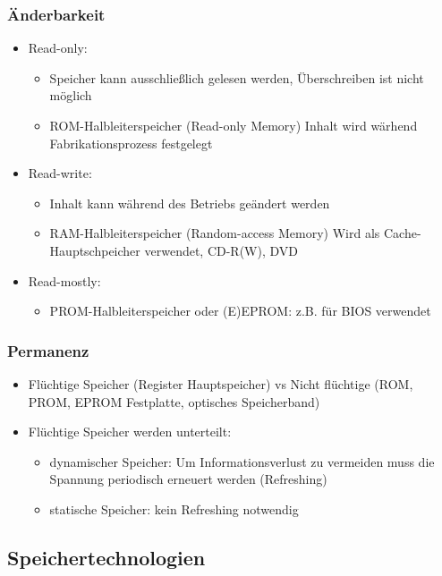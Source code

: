 		\subsubsection{Änderbarkeit}
			\begin{itemize}
				\item Read-only:
					\begin{itemize}
						\item Speicher kann ausschlie\ss lich gelesen werden, Überschreiben ist nicht möglich
						\item ROM-Halbleiterspeicher (Read-only Memory) Inhalt wird wärhend Fabrikationsprozess
							festgelegt
					\end{itemize}
				\item Read-write:
					\begin{itemize}
						\item Inhalt kann während des Betriebs geändert werden
						\item RAM-Halbleiterspeicher (Random-access Memory) Wird als Cache- Hauptschpeicher verwendet, 
							CD-R(W), DVD
					\end{itemize}
				\item Read-mostly:
					\begin{itemize}
						\item PROM-Halbleiterspeicher oder (E)EPROM: z.B. für BIOS verwendet
					\end{itemize}
			\end{itemize}

		\subsubsection{Permanenz}
			\begin{itemize}
				\item Flüchtige Speicher (Register Hauptspeicher) vs Nicht flüchtige (ROM, PROM, EPROM Festplatte, optisches Speicherband)
				\item Flüchtige Speicher werden unterteilt:
					\begin{itemize}
						\item dynamischer Speicher: Um Informationsverlust zu vermeiden muss die Spannung periodisch
							erneuert werden (Refreshing)
						\item statische Speicher: kein Refreshing notwendig
					\end{itemize}
			\end{itemize}


	\subsection{Speichertechnologien}
